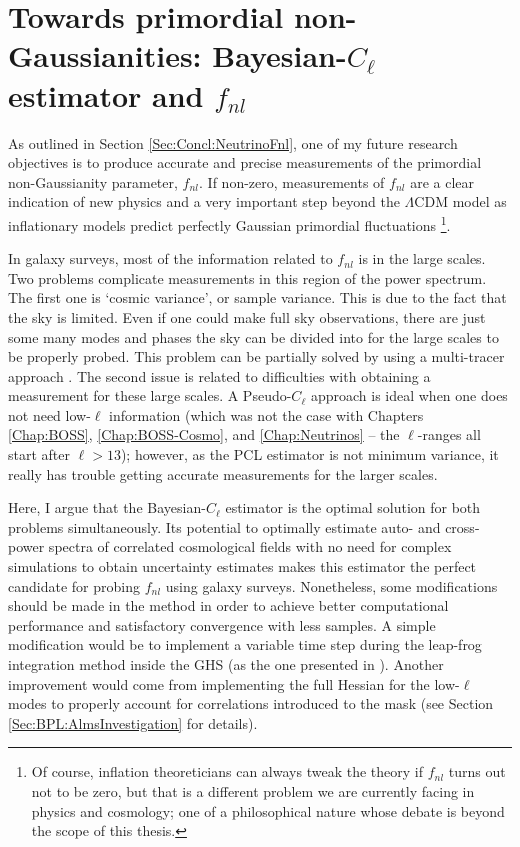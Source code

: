 \section{Towards primordial non-Gaussianities: Bayesian-$C_{\ell}$ estimator and $f_{nl}$}
As outlined in Section \ref{Sec:Concl:NeutrinoFnl}, one of my future research objectives is to produce accurate and precise measurements of the primordial non-Gaussianity parameter, $f_{nl}$. If non-zero, measurements of $f_{nl}$ are a clear indication of new physics and a very important step beyond the $\Lambda$CDM model as inflationary models predict perfectly Gaussian primordial fluctuations \footnote{Of course, inflation theoreticians can always tweak the theory if $f_{nl}$ turns out not to be zero, but that is a different problem we are currently facing in physics and cosmology; one of a philosophical nature whose debate is beyond the scope of this thesis.}.

\qquad In galaxy surveys, most of the information related to $f_{nl}$ is in the large scales. Two problems complicate measurements in this region of the power spectrum. The first one is `cosmic variance', or sample variance. This is due to the fact that the sky is limited. Even if one could make full sky observations, there are just some many modes and phases the sky can be divided into for the large scales to be properly probed. This problem can be partially solved by using a multi-tracer approach \citep{2013AbramoLeonard,2016AbramoSeccoLoureiro}. The second issue is related to difficulties with obtaining a measurement for these large scales. A Pseudo-$C_{\ell}$ approach is ideal when one does not need low-$\ell$ information (which was not the case with Chapters \ref{Chap:BOSS}, \ref{Chap:BOSS-Cosmo}, and \ref{Chap:Neutrinos} -- the $\ell$-ranges all start after $\ell > 13$); however, as the PCL estimator is not minimum variance, it really has trouble getting accurate measurements for the larger scales. 

\qquad Here, I argue that the Bayesian-$C_{\ell}$ estimator is the optimal solution for both problems simultaneously. Its potential to optimally estimate auto- and cross-power spectra of correlated cosmological fields with no need for complex simulations to obtain uncertainty estimates makes this estimator the perfect candidate for probing $f_{nl}$ using galaxy surveys. Nonetheless, some modifications should be made in the method in order to achieve better computational performance and satisfactory convergence with less samples. A simple modification would be to implement a variable time step during the leap-frog integration method inside the GHS (as the one presented in \cite{2013-LNHamiltonian}). Another improvement would come from implementing the full Hessian for the low-$\ell$ modes to properly account for correlations introduced to the mask (see Section \ref{Sec:BPL:AlmsInvestigation} for details).

